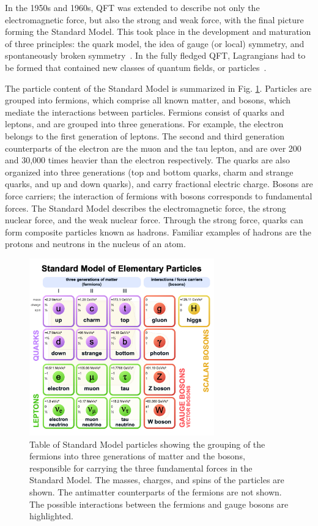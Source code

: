 In the 1950s and 1960s, QFT was extended to describe not only the electromagnetic force, but also the strong and weak force, with the final picture forming the Standard Model. This took place in the development and maturation of three principles: the quark model, the idea of gauge (or local) symmetry, and spontaneously broken symmetry~\cite{Weinberg:799984}. In the fully fledged QFT, Lagrangians had to be formed that contained new classes of quantum fields, or particles~\cite{sep-quantum-field-theory}.

The particle content of the Standard Model is summarized in Fig. \ref{fig:intro-standard-model}. Particles are grouped into fermions, which comprise all known matter, and bosons, which mediate the interactions between particles. Fermions consist of quarks and leptons, and are grouped into three generations. For example, the electron belongs to the first generation of leptons. The second and third generation counterparts of the electron are the muon and the tau lepton, and are over 200 and 30,000 times heavier than the electron respectively. The quarks are also organized into three generations (top and bottom quarks, charm and strange quarks, and up and down quarks), and carry fractional electric charge. Bosons are force carriers; the interaction of fermions with bosons corresponds to fundamental forces. The Standard Model describes the electromagnetic force, the strong nuclear force, and the weak nuclear force. Through the strong force, quarks can form composite particles known as hadrons. Familiar examples of hadrons are the protons and neutrons in the nucleus of an atom.

\begin{figure}[ht]
    \centering
    \includegraphics[width=8cm]{figures/ch-1-introduction/Standard_Model_of_Elementary_Particles.png}
    \caption{Table of Standard Model particles showing the grouping of the fermions into three generations of matter and the bosons, responsible for carrying the three fundamental forces in the Standard Model. The masses, charges, and spins of the particles are shown. The antimatter counterparts of the fermions are not shown. The possible interactions between the fermions and gauge bosons are highlighted.}
    \label{fig:intro-standard-model}
\end{figure}


